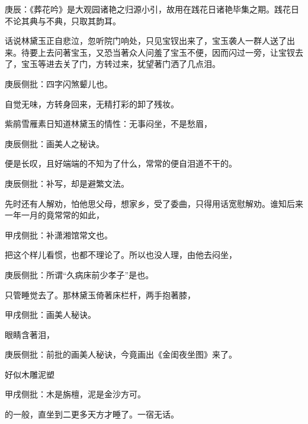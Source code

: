 \begin{parag}
    \begin{note}庚辰：《葬花吟》是大观园诸艳之归源小引，故用在践花日诸艳毕集之期。践花日不论其典与不典，只取其韵耳。\end{note}
\end{parag}


\begin{parag}
    话说林黛玉正自悲泣，忽听院门响处，只见宝钗出来了，宝玉袭人一群人送了出来。待要上去问著宝玉，又恐当著众人问羞了宝玉不便，因而闪过一旁，让宝钗去了，宝玉等进去关了门，方转过来，犹望著门洒了几点泪。\begin{note}庚辰侧批：四字闪煞颦儿也。\end{note}自觉无味，方转身回来，无精打彩的卸了残妆。
\end{parag}


\begin{parag}
    紫鹃雪雁素日知道林黛玉的情性：无事闷坐，不是愁眉，\begin{note}庚辰侧批：画美人之秘诀。\end{note}便是长叹，且好端端的不知为了什么，常常的便自泪道不干的。\begin{note}庚辰侧批：补写，却是避繁文法。\end{note}先时还有人解劝，怕他思父母，想家乡，受了委曲，只得用话宽慰解劝。谁知后来一年一月的竟常常的如此，\begin{note}甲戌侧批：补潇湘馆常文也。\end{note}把这个样儿看惯，也都不理论了。所以也没人理，由他去闷坐，\begin{note}庚辰侧批：所谓“久病床前少孝子”是也。\end{note}只管睡觉去了。那林黛玉倚著床栏杆，两手抱著膝，\begin{note}甲戌侧批：画美人秘诀。\end{note}眼睛含著泪，\begin{note}庚辰侧批：前批的画美人秘诀，今竟画出《金闺夜坐图》来了。\end{note}好似木雕泥塑\begin{note}甲戌侧批：木是旃檀，泥是金沙方可。\end{note}的一般，直坐到二更多天方才睡了。一宿无话。
\end{parag}


